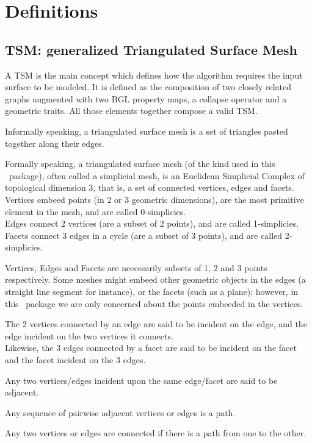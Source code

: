 \section{Definitions}

\subsection{TSM: generalized Triangulated Surface Mesh}

A TSM is the main concept which defines how the algorithm requires the input surface to be modeled. It is defined as the composition of two closely related graphs augmented with two BGL property maps, a collapse operator and a geometric traits. All those elements together compose a valid TSM.

Informally speaking, a triangulated surface mesh is a set of triangles pasted together along their edges.

Formally speaking, a triangulated surface mesh (of the kind used in this \cgal\ package), often called a simplicial mesh, is an Euclidean Simplicial Complex of topological dimension 3, that is, a set of connected vertices, edges and facets.\\
Vertices embeed points (in 2 or 3 geometric dimensions), are the most primitive element in the mesh, and are called 0-simplicies.\\
Edges connect 2 vertices (are a subset of 2 points), and are called 1-simplicies.\\
Facets connect 3 edges in a cycle (are a subset of 3 points), and are called 2-simplicies.

Vertices, Edges and Facets are neccesarily subsets of 1, 2 and 3 points respectively. Some meshes might embeed other geometric objects in the edges (a straight line segment for instance), or the facets (such as a plane); however, in this \cgal\ package we are only concerned about the points embeeded in the vertices.

The 2 vertices connected by an edge are said to be incident on the edge, and the edge incident on the two vertices it connects.\\
Likewise, the 3 edges connected by a facet are said to be incident on the facet and the facet incident on the 3 edges.

Any two vertices/edges incident upon the same edge/facet are said to be adjacent.

Any sequence of pairwise adjacent vertices or edges is a path.

Any two vertices or edges are connected if there is a path from one to the other.

